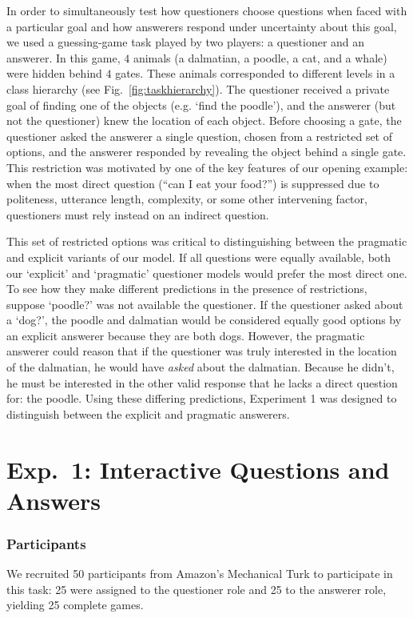 \documentclass[12pt, floatsintext, jou]{apa6}
\begin{document}
In order to simultaneously test how questioners choose questions when faced with a particular goal and how answerers respond  under uncertainty about this goal, we used a guessing-game task played by two players: a questioner and an answerer. In this game, $4$ animals (a dalmatian, a poodle, a cat, and a whale) were hidden behind $4$ gates. These animals corresponded to different levels in a class hierarchy (see Fig.~\ref{fig:taskhierarchy}). The questioner received a private goal of finding one of the objects (e.g. `find the poodle'), and the answerer (but not the questioner) knew the location of each object. Before choosing a gate, the questioner asked the answerer a single question, chosen from a restricted set of options, and the answerer responded by revealing the object behind a single gate. This restriction was motivated by one of the key features of our opening example: when the most direct question (``can I eat your food?'') is suppressed due to politeness, utterance length, complexity, or some other intervening factor, questioners must rely instead on an indirect question. 

This set of restricted options was critical to distinguishing between the pragmatic and explicit variants of our model. If all questions were equally available, both our `explicit' and `pragmatic' questioner models would prefer the most direct one. To see how they make different predictions in the presence of restrictions, suppose `poodle?' was not available the questioner. If the questioner asked about a `dog?', the poodle and dalmatian would be considered equally good options by an explicit answerer because they are both dogs. However, the pragmatic answerer could reason that if the questioner was truly interested in the location of the dalmatian, he would have \emph{asked} about the dalmatian. Because he didn't, he must be interested in the other valid response that he lacks a direct question for: the poodle. Using these differing predictions, Experiment 1 was designed to distinguish between the explicit and pragmatic answerers.

\section{Exp.~1: Interactive Questions and Answers}


\subsubsection{Participants} We recruited 50 participants
from Amazon's Mechanical Turk to participate in this task: 25 were assigned to the  questioner role and 25 to the answerer role, yielding 25 complete games.
\end{document}
